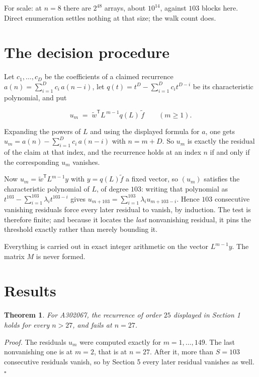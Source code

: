 \documentclass[11pt]{article}
\newtheorem{theorem}{Theorem}
\theoremstyle{definition}
\begin{document}
For scale: at $n = 8$ there are $2^{48}$ arrays, about $10^{14}$, against $103$ blocks here. Direct enumeration settles nothing at that size; the walk count does.

\section{The decision procedure}

Let $c_1,\dots,c_D$ be the coefficients of a claimed recurrence $a(n) = \sum_{i=1}^{D} c_i\,a(n-i)$, let $q(t) = t^{D} - \sum_{i=1}^{D} c_i t^{D-i}$ be its characteristic polynomial, and put

\[u_m \;=\; \tilde w^{\mathsf T} L^{\,m-1} q(L)\,\tilde f \qquad (m \ge 1).\]

Expanding the powers of $L$ and using the displayed formula for $a$, one gets $u_m = a(n) - \sum_{i=1}^{D} c_i\,a(n-i)$ with $n = m + D$. So $u_m$ is exactly the residual of the claim at that index, and the recurrence holds at an index $n$ if and only if the corresponding $u_m$ vanishes.

Now $u_m = \tilde w^{\mathsf T} L^{m-1} y$ with $y = q(L)\tilde f$ a fixed vector, so $(u_m)$ satisfies the characteristic polynomial of $L$, of degree $103$: writing that polynomial as $t^{103} - \sum_{i=1}^{103} \lambda_i t^{103-i}$ gives $u_{m+103} = \sum_{i=1}^{103} \lambda_i u_{m+103-i}$. Hence $103$ consecutive vanishing residuals force every later residual to vanish, by induction. The test is therefore finite; and because it locates the {\itshape last} nonvanishing residual, it pins the threshold exactly rather than merely bounding it.

Everything is carried out in exact integer arithmetic on the vector $L^{m-1}y$. The matrix $M$ is never formed.

\section{Results}

\begin{theorem} For A302067, the recurrence of order $25$ displayed in Section 1 holds for every $n > 27$, and fails at $n = 27$.\end{theorem}

{\itshape Proof.} The residuals $u_m$ were computed exactly for $m = 1,\dots,149$. The last nonvanishing one is at $m = 2$, that is at $n = 27$. After it, more than $S = 103$ consecutive residuals vanish, so by Section 5 every later residual vanishes as well. $\square$
\end{document}
